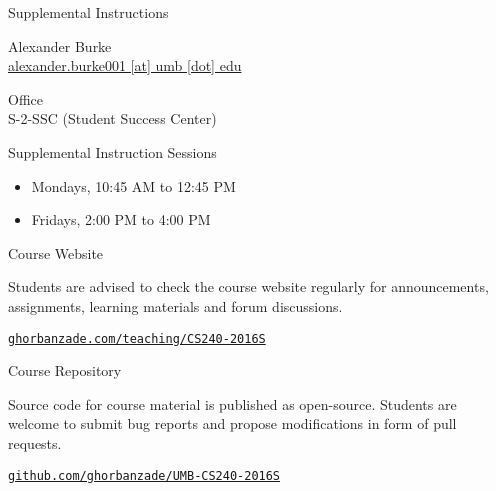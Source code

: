 \documentclass[compress]{beamer}
\begin{document}
\begin{slide}
	\begin{block}{Supplemental Instructions}
		
	Alexander Burke\\
	\href{mailto:alexander.burke001@umb.edu}{alexander.burke001 [at] umb [dot] edu}

	\par
	\vspace{0.5em}
	{\large Office}\\
	S-2-SSC (Student Success Center)

	\par
	\vspace{0.5em}
	{\large Supplemental Instruction Sessions}
	\begin{itemize}
	\item[] Mondays, 10:45 AM to 12:45 PM
	\item[] Fridays, 2:00 PM to 4:00 PM
	\end{itemize}

	\end{block}
\end{slide}

\begin{slide}
	\begin{block}{Course Website}

	Students are advised to check the course website regularly for announcements, assignments, learning materials and forum discussions.

	\begin{center}
	\href{http://ghorbanzade.com/teaching/cs240-2016s}{\texttt{ghorbanzade.com/teaching/CS240-2016S}}
	\end{center}

	\end{block}
\end{slide}

\begin{slide}
	\begin{block}{Course Repository}

	Source code for course material is published as open-source.
	Students are welcome to submit bug reports and propose modifications in form of pull requests.

	\begin{center}
	\href{https://github.com/ghorbanzade/umb-cs240-2016s}{\texttt{github.com/ghorbanzade/UMB-CS240-2016S}}
	\end{center}

	\end{block}
\end{slide}
\end{document}
